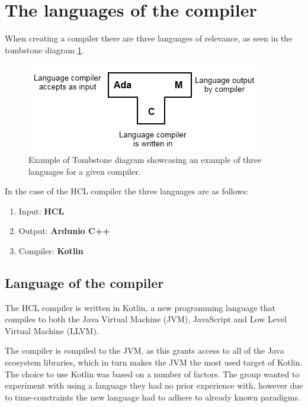 \section{The languages of the compiler}
\label{langsOfCompiler}
When creating a compiler there are three languages of relevance, as seen in the tombstone diagram \ref{fig:TStoneExample}.

\begin{figure}[H]
	\centering
	\includegraphics[width=\textwidth/2+\textwidth/4]{4.Solution/images/T-diagram.png}
	\caption{
		Example of Tombstone diagram showcasing an example of three languages for a given compiler\cite{TStoneWiki}.
	}
	\label{fig:TStoneExample}
\end{figure}
In the case of the HCL compiler the three languages are as follows:

\begin{enumerate}
\item Input: \textbf{HCL} \\
\item Output: \textbf{Ardunio C++} \\
\item Compiler: \textbf{Kotlin} \\
\end{enumerate}

\subsection{Language of the compiler}
The HCL compiler is written in Kotlin\cite{KotlinWebsite}, a new programming language that compiles to both the Java Virtual Machine (JVM), JavaScript and Low Level Virtual Machine (LLVM).

The compiler is compiled to the JVM, as this grants access to all of the Java ecosystem libraries, which in turn makes the JVM the most used target of Kotlin.
The choice to use Kotlin was based on a number of factors.
The group wanted to experiment with using a language they had no prior experience with, however due to time-constraints the new language had to adhere to already known paradigms.

